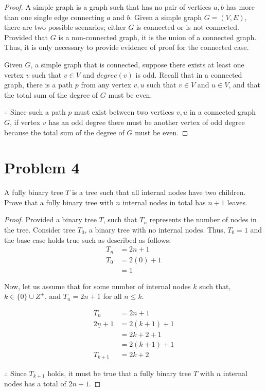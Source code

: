 \documentclass[11pt]{article}
\begin{document}
\begin{proof}
A simple graph is a graph such that has no pair of vertices $a,b$ has more than one single edge connecting $a$ and $b$. Given a simple graph $G = (V,E)$, there are two possible scenarios; either $G$ is connected or is not connected. Provided that $G$ is a non-connected graph, it is the union of a connected graph. Thus, it is only necessary to provide evidence of proof for the connected case.
\newline

\noindent
Given $G$, a simple graph that is connected, suppose there exists at least one vertex $v$ such that $v \in V$ and $degree(v)$ is odd. Recall that in a connected graph, there is a path $p$ from any vertex $v,u$ such that $v \in V$ and $u \in V$, and that the total sum of the degree of $G$ must be even.
\newline

\noindent
$\therefore$ Since such a path $p$ must exist between two vertices $v,u$ in a connected graph $G$, if vertex $v$ has an odd degree there must be another vertex of odd degree because the total sum of the degree of $G$ must be even.
\end{proof}

\newpage
\section*{Problem 4}
A fully binary tree $T$ is a tree such that all internal nodes have two children. Prove that a fully binary tree with $n$ internal nodes in total has $n + 1$ leaves.
\begin{proof}
Provided a binary tree $T$, such that $T_{n}$ represents the number of nodes in the tree. Consider tree $T_{0}$, a binary tree with no internal nodes. Thus, $T_{0} = 1$ and the base case holds true such as described as follows:
\begin{align*}
    T_{n} & = 2n + 1 \\
    T_{0} & = 2(0) + 1\\
    & = 1    
\end{align*}

\noindent
Now, let us assume that for some number of internal nodes $k$ such that, $k \in \{0\} \cup Z^{+}$, and $T_{n} = 2n + 1$ for all $n \le k$.

\begin{align*}
    T_{n} & = 2n + 1 \\
    2\underline{n} + 1 & = 2(\underline{k+1}) + 1 \\
    & = 2k + 2 + 1 \\
    & = 2(k+1) + 1\\
    T_{k+1} & = 2k + 2
\end{align*}

\noindent
$\therefore$ Since $T_{k+1}$ holds, it must be true that a fully binary tree $T$ with $n$ internal nodes has a total of $2n+1$.
\end{proof}
\end{document}
